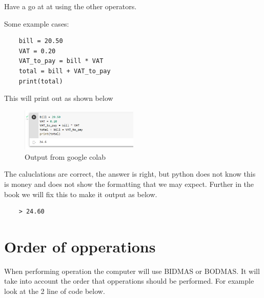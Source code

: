 \documentclass[12pt,a4paper, red]{bbe}
\begin{document}
	\begin{remark}
	Have a go at at using the other operators.
	\end{remark}
	
	Some example cases:
	
	\begin{lstlisting}
    bill = 20.50
    VAT = 0.20
    VAT_to_pay = bill * VAT
    total = bill + VAT_to_pay
    print(total)\end{lstlisting}
    
    This will print out as shown below
    
    \begin{figure}[h]
        \centering
        \includegraphics[width=0.5\textwidth]{images/ch2/bil.PNG}
        \caption{Output from google colab}
    \end{figure}
    
    The caluclations are correct, the answer is right, but python does not know this is money and does not show the formatting that we may expect. Further in the book we will fix this to make it output as below.
    
    \begin{lstlisting}
    > 24.60\end{lstlisting}
    
\section{Order of opperations}

	When performing operation the computer will use BIDMAS or BODMAS. It will take into account the order that opperations should be performed. For example look at the 2 line of code below.
\end{document}
